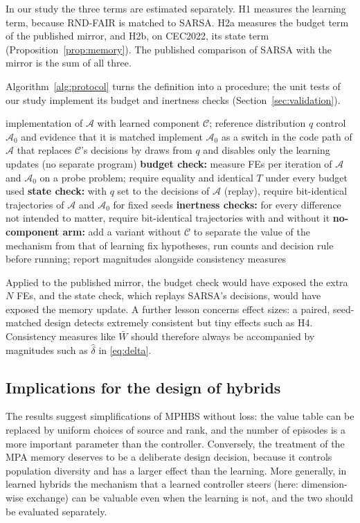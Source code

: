 \documentclass[11pt]{article}
\theoremstyle{definition}
\theoremstyle{remark}
\begin{document}
In our study the three terms are estimated separately. H1 measures the learning term, because RND-FAIR is matched to
SARSA. H2a measures the budget term of the published mirror, and H2b, on CEC2022, its state term
(Proposition~\ref{prop:memory}). The published comparison of SARSA with the mirror is the sum of all three.

Algorithm~\ref{alg:protocol} turns the definition into a procedure; the unit tests of our study implement its
budget and inertness checks (Section~\ref{sec:validation}).

\begin{algorithm}[t]
\caption{Constructing and verifying a matched control for a learned component}
\label{alg:protocol}
\small
\begin{algorithmic}[1]
\Require implementation of $\mathcal A$ with learned component $\mathcal C$; reference distribution $q$
\Ensure control $\mathcal A_0$ and evidence that it is matched
\State implement $\mathcal A_0$ as a switch in the code path of $\mathcal A$ that replaces $\mathcal C$'s decisions by
  draws from $q$ and disables only the learning updates (no separate program)
\State \textbf{budget check:} measure FEs per iteration of $\mathcal A$ and $\mathcal A_0$ on a probe problem; require equality
  and identical $T$ under every budget used
\State \textbf{state check:} with $q$ set to the decisions of $\mathcal A$ (replay), require bit-identical trajectories of
  $\mathcal A$ and $\mathcal A_0$ for fixed seeds
\State \textbf{inertness checks:} for every difference not intended to matter, require bit-identical trajectories with and
  without it
\State \textbf{no-component arm:} add a variant without $\mathcal C$ to separate the value of the mechanism from that of learning
\State fix hypotheses, run counts and decision rule before running; report magnitudes alongside consistency measures
\end{algorithmic}
\end{algorithm}

Applied to the published mirror, the budget check would have exposed the extra $N$ FEs, and the state check, which
replays SARSA's decisions, would have exposed the memory update. A further lesson concerns effect sizes: a paired, seed-matched
design detects extremely consistent but tiny effects such as H4. Consistency measures like $\bar W$ should therefore always
be accompanied by magnitudes such as $\hat\delta$ in \eqref{eq:delta}.

\subsection{Implications for the design of hybrids}
The results suggest simplifications of MPHBS without loss: the value table can be replaced by uniform choices of source and
rank, and the number of episodes is a more important parameter than the controller. Conversely, the treatment of the MPA
memory deserves to be a deliberate design decision, because it controls population diversity and has a larger effect than
the learning. More generally, in learned hybrids the mechanism that a learned controller steers (here: dimension-wise
exchange) can be valuable even when the learning is not, and the two should be evaluated separately.
\end{document}
